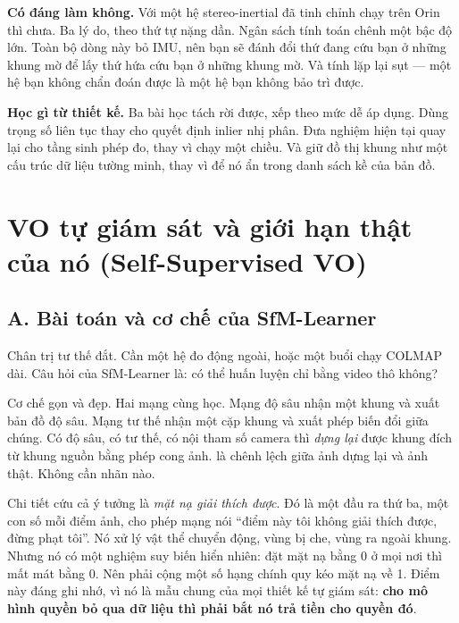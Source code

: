 \documentclass[../../deep_learning.tex]{subfiles}
\begin{document}
\textbf{Có đáng làm không.} Với một hệ stereo-inertial đã tinh chỉnh chạy trên Orin thì chưa. Ba lý do, theo thứ tự nặng dần. Ngân sách tính toán chênh một bậc độ lớn. Toàn bộ dòng này bỏ IMU, nên bạn sẽ đánh đổi thứ đang cứu bạn ở những khung mờ để lấy thứ hứa cứu bạn ở những khung mờ. Và tính lặp lại sụt --- một hệ bạn không chẩn đoán được là một hệ bạn không bảo trì được.

\textbf{Học gì từ thiết kế.} Ba bài học tách rời được, xếp theo mức dễ áp dụng. Dùng trọng số liên tục thay cho quyết định inlier nhị phân. Đưa nghiệm hiện tại quay lại cho tầng sinh phép đo, thay vì chạy một chiều. Và giữ đồ thị khung như một cấu trúc dữ liệu tường minh, thay vì để nó ẩn trong danh sách kề của bản đồ.


\section{VO tự giám sát và giới hạn thật của nó (Self-Supervised VO)}

\subsection{A. Bài toán và cơ chế của SfM-Learner}
Chân trị tư thế đắt. Cần một hệ đo động ngoài, hoặc một buổi chạy COLMAP dài. Câu hỏi của SfM-Learner \cite{zhou2017sfmlearner} là: có thể huấn luyện chỉ bằng video thô không?

Cơ chế gọn và đẹp. Hai mạng cùng học. Mạng độ sâu nhận một khung và xuất bản đồ độ sâu. Mạng tư thế nhận một cặp khung và xuất phép biến đổi giữa chúng. Có độ sâu, có tư thế, có nội tham số camera thì \emph{dựng lại} được khung đích từ khung nguồn bằng phép cong ảnh.  là chênh lệch giữa ảnh dựng lại và ảnh thật. Không cần nhãn nào.

Chi tiết cứu cả ý tưởng là \emph{mặt nạ giải thích được}. Đó là một đầu ra thứ ba, một con số mỗi điểm ảnh, cho phép mạng nói ``điểm này tôi không giải thích được, đừng phạt tôi''. Nó xử lý vật thể chuyển động, vùng bị che, vùng ra ngoài khung. Nhưng nó có một nghiệm suy biến hiển nhiên: đặt mặt nạ bằng 0 ở mọi nơi thì mất mát bằng 0. Nên phải cộng một số hạng chính quy kéo mặt nạ về 1. Điểm này đáng ghi nhớ, vì nó là mẫu chung của mọi thiết kế tự giám sát: \textbf{cho mô hình quyền bỏ qua dữ liệu thì phải bắt nó trả tiền cho quyền đó}.
\end{document}
